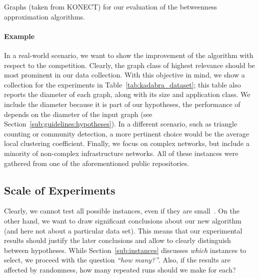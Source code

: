 \documentclass[algorithms,article,submit,moreauthors,pdftex]{Definitions/mdpi}
\newcounter{guideline}
\newcommand{\changed}[1]{#1}
\begin{document}
\begin{table}[tb]
\caption{Graphs (taken from KONECT) for our evaluation of the betweenness approximation algorithms.}
\label{tab:kadabra_dataset}
\centering
\footnotesize

\end{table}

\paragraph{\kad Example}
In a real-world scenario, we want to show the improvement of the \kad algorithm with respect to the competition.
Clearly, the graph class of highest relevance should be most prominent in our data collection.
With this objective in mind, we show a collection for the \kad experiments in Table~\ref{tab:kadabra_dataset}; \changed{this table also reports} the diameter of each graph, along with its size and application class.
We include the diameter because it is part of our hypotheses, \ie
the performance of \kad depends on the diameter of the input graph
(see Section~\ref{sub:guidelines:hypotheses}).
In a different scenario, such as triangle counting or community detection, a more pertinent choice would
be the average local clustering coefficient.
Finally, we focus on complex networks, but include a minority of non-complex infrastructure networks.
All of these instances were gathered from one of the aforementioned public repositories.

\subsection{Scale of Experiments}
\label{sub:variance}
%
Clearly, we cannot test all possible instances, even if they are small~\cite{McGeochP00}.
On the other hand, we want to draw significant conclusions about our new algorithm (and here not about
a particular data set). This means that our experimental results should justify the later conclusions
and allow to clearly distinguish between hypotheses.
%
While Section~\ref{sub:instances} discusses \emph{which} instances to select, we proceed with the question
\emph{``how many?''}.
Also, if the results are affected by randomness, how many repeated runs should we make for each?
\end{document}
